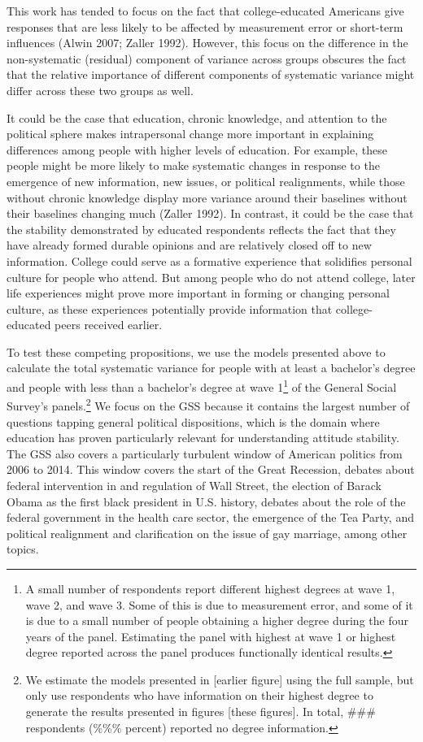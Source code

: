 \documentclass[
  11pt,
]{article}
\begin{document}
This work has tended to focus on the fact that college-educated
Americans give responses that are less likely to be affected by
measurement error or short-term influences (Alwin 2007; Zaller 1992).
However, this focus on the difference in the non-systematic (residual)
component of variance across groups obscures the fact that the relative
importance of different components of systematic variance might differ
across these two groups as well.

It could be the case that education, chronic knowledge, and attention to
the political sphere makes intrapersonal change more important in
explaining differences among people with higher levels of education. For
example, these people might be more likely to make systematic changes in
response to the emergence of new information, new issues, or political
realignments, while those without chronic knowledge display more
variance around their baselines without their baselines changing much
(Zaller 1992). In contrast, it could be the case that the stability
demonstrated by educated respondents reflects the fact that they have
already formed durable opinions and are relatively closed off to new
information. College could serve as a formative experience that
solidifies personal culture for people who attend. But among people who
do not attend college, later life experiences might prove more important
in forming or changing personal culture, as these experiences
potentially provide information that college-educated peers received
earlier.

To test these competing propositions, we use the models presented above
to calculate the total systematic variance for people with at least a
bachelor's degree and people with less than a bachelor's degree at wave
1\footnote{A small number of respondents report different highest
  degrees at wave 1, wave 2, and wave 3. Some of this is due to
  measurement error, and some of it is due to a small number of people
  obtaining a higher degree during the four years of the panel.
  Estimating the panel with highest at wave 1 or highest degree reported
  across the panel produces functionally identical results.} of the
General Social Survey's panels.\footnote{We estimate the models
  presented in {[}earlier figure{]} using the full sample, but only use
  respondents who have information on their highest degree to generate
  the results presented in figures {[}these figures{]}. In total, \#\#\#
  respondents (\%\%\% percent) reported no degree information.} We focus
on the GSS because it contains the largest number of questions tapping
general political dispositions, which is the domain where education has
proven particularly relevant for understanding attitude stability. The
GSS also covers a particularly turbulent window of American politics
from 2006 to 2014. This window covers the start of the Great Recession,
debates about federal intervention in and regulation of Wall Street, the
election of Barack Obama as the first black president in U.S. history,
debates about the role of the federal government in the health care
sector, the emergence of the Tea Party, and political realignment and
clarification on the issue of gay marriage, among other topics.
\end{document}

